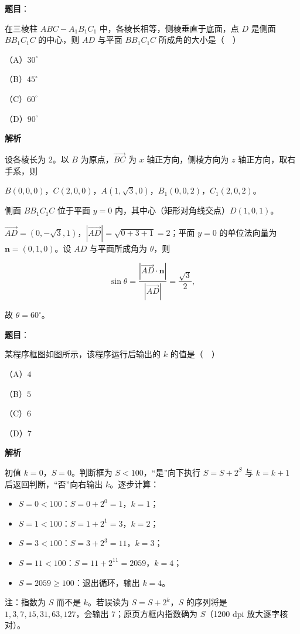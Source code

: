\begin{answer}

\textbf{题目}：

在三棱柱 $ABC-A_1B_1C_1$ 中，各棱长相等，侧棱垂直于底面，点 $D$ 是侧面 $BB_1C_1C$ 的中心，则 $AD$ 与平面 $BB_1C_1C$ 所成角的大小是（　）

（A）$30^\circ$

（B）$45^\circ$

（C）$60^\circ$

（D）$90^\circ$

\textbf{解析}

设各棱长为 $2$。以 $B$ 为原点，$\overrightarrow{BC}$ 为 $x$ 轴正方向，侧棱方向为 $z$ 轴正方向，取右手系，则

$B(0,0,0)$，$C(2,0,0)$，$A(1,\sqrt3,0)$，$B_1(0,0,2)$，$C_1(2,0,2)$。

侧面 $BB_1C_1C$ 位于平面 $y=0$ 内，其中心（矩形对角线交点）$D(1,0,1)$。

$\overrightarrow{AD}=(0,-\sqrt3,1)$，$|\overrightarrow{AD}|=\sqrt{0+3+1}=2$；平面 $y=0$ 的单位法向量为 $\boldsymbol n=(0,1,0)$。设 $AD$ 与平面所成角为 $\theta$，则

\nopagebreak[4]
\[\sin\theta=\frac{|\overrightarrow{AD}\cdot\boldsymbol n|}{|\overrightarrow{AD}|}=\frac{\sqrt3}{2},\]

故 $\theta=60^\circ$。


\end{answer}
\begin{answer}

\textbf{题目}：

某程序框图如图所示，该程序运行后输出的 $k$ 的值是（　）

（A）$4$

（B）$5$

（C）$6$

（D）$7$
\nopagebreak[4]
\begin{center}\end{center}
\nopagebreak[4]
\textbf{解析}

初值 $k=0$，$S=0$。判断框为 $S<100$，“是”向下执行 $S=S+2^S$ 与 $k=k+1$ 后返回判断，“否”向右输出 $k$。逐步计算：

\begin{itemize}
\item $S=0<100$：$S=0+2^0=1$，$k=1$；
\item $S=1<100$：$S=1+2^1=3$，$k=2$；
\item $S=3<100$：$S=3+2^3=11$，$k=3$；
\item $S=11<100$：$S=11+2^{11}=2059$，$k=4$；
\item $S=2059\geqslant100$：退出循环，输出 $k=4$。
\end{itemize}

注：指数为 $S$ 而不是 $k$。若误读为 $S=S+2^k$，$S$ 的序列将是 $1,3,7,15,31,63,127$，会输出 $7$；原页方框内指数确为 $S$（1200 dpi 放大逐字核对）。


\end{answer}
